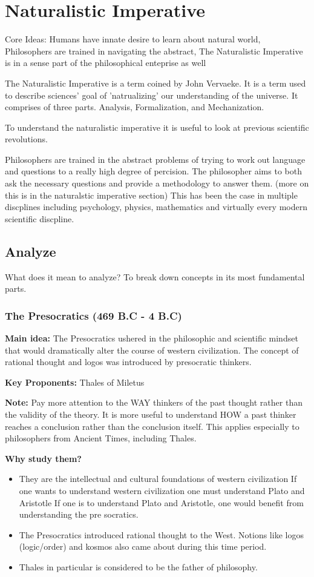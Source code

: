 \documentclass[twoside]{article}
\begin{document}
\section{Naturalistic Imperative}
Core Ideas: Humans have innate desire to learn about natural world, Philosophers
are trained in navigating the abstract, The Naturalistic Imperative is in a
sense part of the philosophical enteprise as well

The Naturalistic Imperative is a term coined by John Vervaeke. It is a term used
to describe sciences' goal of 'natrualizing' our understanding of the
universe. It comprises of three parts. Analysis, Formalization, and Mechanization.

To understand the naturalistic imperative it is useful to look at previous scientific revolutions.

Philosophers are trained in the abstract problems of trying to work out
language and questions to a really high degree of percision. The philosopher aims
to both ask the necessary questions and provide a methodology to answer them. (more
on this is in the naturalstic imperative section) This has been the case in multiple
discplines including psychology, physics, mathematics and virtually every modern
scientific discpline.

\subsection{Analyze}
What does it mean to analyze? To break down concepts in its most fundamental
parts.

\subsubsection{The Presocratics (469 B.C - 4 B.C)}
\textbf{Main idea:} The Presocratics ushered in the philosophic and scientific
mindset that would dramatically alter the course of western civilization. The concept
of rational thought and logos was introduced by presocratic thinkers.

\textbf{Key Proponents: } Thales of Miletus

\textbf{Note:} Pay more attention to the WAY thinkers of the past thought
rather than the validity of the theory. It is more useful to understand HOW a past
thinker reaches a conclusion rather than the conclusion itself. This applies especially
to philosophers from Ancient Times, including Thales.

\textbf{Why study them?}
\begin{itemize}
  \item  They are the intellectual and cultural foundations of western civilization
  If one wants to understand western civilization one must understand Plato and Aristotle
  If one is to understand Plato and Aristotle, one would benefit from understanding the pre socratics.
  \item  The Presocratics introduced rational thought to the West. Notions like logos (logic/order)
  and kosmos also came about during this time period.
  \item Thales in particular is considered to be the father of philosophy.
\end{itemize}
\end{document}

